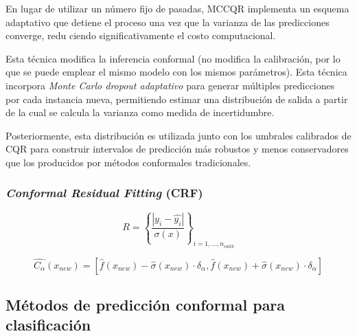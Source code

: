 En lugar de utilizar un número fijo de pasadas, MCCQR implementa un esquema adaptativo que detiene el proceso 
una vez que la varianza de las predicciones converge, redu ciendo significativamente el costo computacional.





Esta técnica modifica la inferencia conformal (no modifica la calibración, por lo que se puede emplear el 
mismo modelo con los mismos parámetros). Esta técnica incorpora \textit{Monte Carlo dropout adaptativo} 
para generar múltiples predicciones por cada instancia nueva, permitiendo estimar una distribución de 
salida a partir de la cual se calcula la varianza como medida de incertidumbre.

Posteriormente, esta distribución es utilizada junto con los umbrales calibrados de CQR 
para construir intervalos de predicción más robustos y menos conservadores que los producidos por métodos 
conformales tradicionales. 







\subsubsection{\textit{Conformal Residual Fitting} (CRF)}


$$
R = \left\{ 
        \frac{| y_i - \hat{y_i} |}{\sigma(x)} 
    \right\}_{i=1,...,n_{calib}}
$$


$$
\hat{C_\alpha}(x_{new}) = 
    \left[ 
        \hat{f}(x_{new})- \hat{\sigma}(x_{new}) \cdot \delta_\alpha, 
        \hat{f}(x_{new})+ \hat{\sigma}(x_{new}) \cdot \delta_\alpha
    \right]
$$




\subsection{Métodos de predicción conformal para clasificación}



